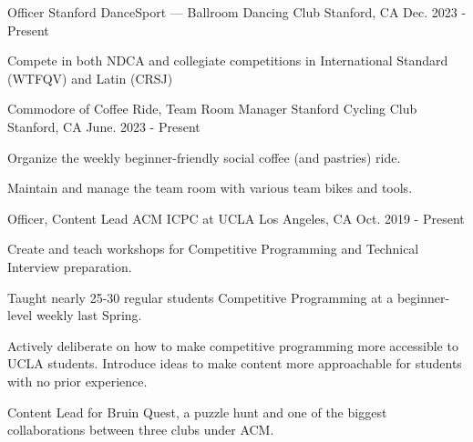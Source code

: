 

\begin{cventries}

\cventry
{Officer} %
{Stanford DanceSport — Ballroom Dancing Club} %
{Stanford, CA} %
{Dec. 2023 - Present} %
{
  \begin{cvitems} %
    \item{Compete in both NDCA and collegiate competitions in International Standard (WTFQV) and Latin (CRSJ)}
  \end{cvitems}
}

\cventry
{Commodore of Coffee Ride, Team Room Manager} %
{Stanford Cycling Club} %
{Stanford, CA} %
{June. 2023 - Present} %
{
  \begin{cvitems} %
      \item{Organize the weekly beginner-friendly social coffee (and pastries) ride.}
    \item{Maintain and manage the team room with various team bikes and tools.}
  \end{cvitems}
}

\cventry
{Officer, Content Lead} %
{ACM ICPC at UCLA} %
{Los Angeles, CA} %
{Oct. 2019 - Present} %
{
  \begin{cvitems} %
    \item{Create and teach workshops for Competitive Programming and Technical Interview preparation.}
    \item{Taught nearly 25-30 regular
students Competitive Programming at a beginner-level weekly last Spring.}
    \item{Actively deliberate on how to make competitive programming more accessible to UCLA students. Introduce ideas to make content more approachable for students with no prior experience.}
    \item{Content Lead for Bruin Quest, a puzzle hunt and one of the biggest collaborations between three clubs under ACM.}
  \end{cvitems}
}


\end{cventries}
